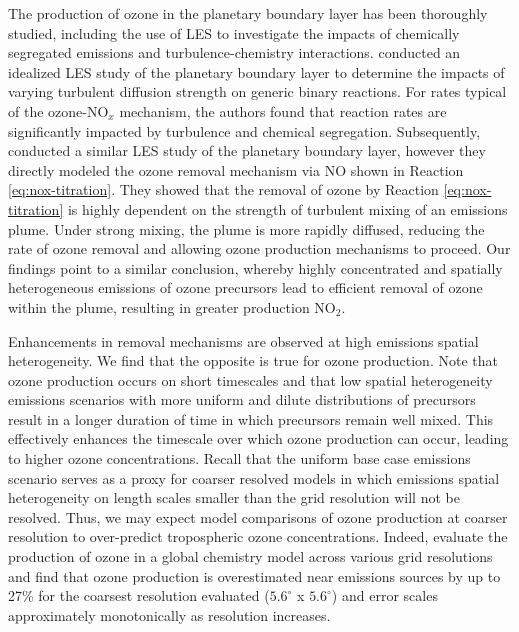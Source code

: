 The production of ozone in the planetary boundary layer has been thoroughly studied, including the use of LES to investigate the impacts of chemically segregated emissions and turbulence-chemistry interactions. \textcite{schumann_large-eddy_1989} conducted an idealized LES study of the planetary boundary layer to determine the impacts of varying turbulent diffusion strength on generic binary reactions. For rates typical of the ozone-NO$_x$ mechanism, the authors found that reaction rates are significantly impacted by turbulence and chemical segregation. Subsequently, \textcite{sykes_large-eddy_1992} conducted a similar LES study of the planetary boundary layer, however they directly modeled the ozone removal mechanism via NO shown in Reaction \ref{eq:nox-titration}. They showed that the removal of ozone by Reaction \ref{eq:nox-titration} is highly dependent on the strength of turbulent mixing of an emissions plume. Under strong mixing, the plume is more rapidly diffused, reducing the rate of ozone removal and allowing ozone production mechanisms to proceed. Our findings point to a similar conclusion, whereby highly concentrated and spatially heterogeneous emissions of ozone precursors lead to efficient removal of ozone within the plume, resulting in greater production NO$_2$. 

Enhancements in removal mechanisms are observed at high emissions spatial heterogeneity. We find that the opposite is true for ozone production. Note that ozone production occurs on short timescales and that low spatial heterogeneity emissions scenarios with more uniform and dilute distributions of precursors result in a longer duration of time in which precursors remain well mixed. This effectively enhances the timescale over which ozone production can occur, leading to higher ozone concentrations. Recall that the uniform base case emissions scenario serves as a proxy for coarser resolved models in which emissions spatial heterogeneity on length scales smaller than the grid resolution will not be resolved. Thus, we may expect model comparisons of ozone production at coarser resolution to over-predict tropospheric ozone concentrations. Indeed, \textcite{wild_global_2006} evaluate the production of ozone in a global chemistry model across various grid resolutions and find that ozone production is overestimated near emissions sources by up to 27\% for the coarsest resolution evaluated ($5.6^{\circ}$ x $5.6^{\circ}$) and error scales approximately monotonically as resolution increases. 


